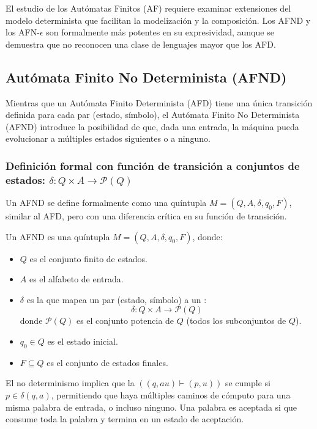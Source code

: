 El estudio de los Autómatas Finitos (AF) requiere examinar extensiones del modelo determinista que facilitan la modelización y la composición. Los AFND y los AFN-$\epsilon$ son formalmente más potentes en su expresividad, aunque se demuestra que no reconocen una clase de lenguajes mayor que los AFD.

\subsection{Autómata Finito No Determinista (AFND)} %

Mientras que un Autómata Finito Determinista (AFD) tiene una única transición definida para cada par (estado, símbolo), el Autómata Finito No Determinista (AFND) introduce la posibilidad de que, dada una entrada, la máquina pueda evolucionar a múltiples estados siguientes o a ninguno.

\subsubsection{Definición formal con función de transición a conjuntos de estados: $\delta: Q \times A \to \mathcal{P}(Q)$}

Un AFND se define formalmente como una quíntupla $M = (Q, A, \delta, q_0, F)$, similar al AFD, pero con una diferencia crítica en su función de transición.

\begin{definicion}
Un AFND es una quíntupla $M = (Q, A, \delta, q_0, F)$, donde:
\begin{itemize}
    \item $Q$ es el conjunto finito de estados.
    \item $A$ es el alfabeto de entrada.
    \item $\delta$ es la  que mapea un par (estado, símbolo) a un :
    \[ \delta : Q \times A \to \mathcal{P}(Q) \]
    donde $\mathcal{P}(Q)$ es el conjunto potencia de $Q$ (todos los subconjuntos de $Q$).
    \item $q_0 \in Q$ es el estado inicial.
    \item $F \subseteq Q$ es el conjunto de estados finales.
\end{itemize}
\end{definicion}

El no determinismo implica que la  $((q, au) \vdash (p, u))$ se cumple si $p \in \delta(q, a)$, permitiendo que haya múltiples caminos de cómputo para una misma palabra de entrada, o incluso ninguno. Una palabra es aceptada si  que consume toda la palabra y termina en un estado de aceptación.

